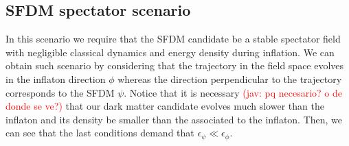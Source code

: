 \documentclass[amssymb,twocolumn,prd,nofootinbib,showpacs]{revtex4-1}
\newcommand{\jav}[1]{\textcolor{red}{(jav: #1)}}
\begin{document}
\subsection{SFDM spectator scenario}

In this scenario we require that the SFDM candidate be a stable spectator field with negligible classical dynamics 
and energy density during inflation. 
We can obtain such scenario by considering that the trajectory in the field space evolves in the inflaton 
direction $\phi$ whereas the direction perpendicular to the trajectory corresponds to the SFDM $\psi$. 
Notice that it is necessary \jav{pq necesario? o de donde se ve?} that our dark matter candidate evolves 
much slower than the inflaton and its density be smaller than the associated to the inflaton. 
Then, we can see that the last conditions demand that $\epsilon_\psi\ll \epsilon_\phi$.
\end{document}
